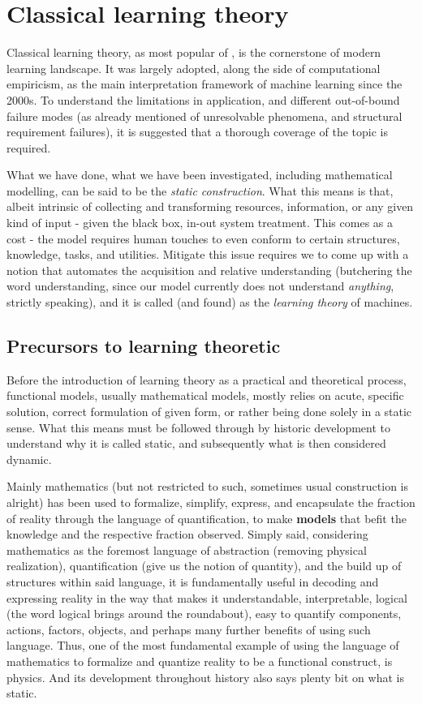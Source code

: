 \chapter{Classical learning theory}

Classical learning theory, as most popular of \cite{10.1145/1968.1972,Vapnik1999-VAPTNO,vapnik1971}, is the cornerstone of modern learning landscape. It was largely adopted, along the side of computational empiricism, as the main interpretation framework of machine learning since the 2000s. To understand the limitations in application, and different out-of-bound failure modes (as already mentioned of unresolvable phenomena, and structural requirement failures), it is suggested that a thorough coverage of the topic is required. 

What we have done, what we have been investigated, including mathematical modelling, can be said to be the \textit{static construction}. What this means is that, albeit intrinsic of collecting and transforming resources, information, or any given kind of input - given the black box, in-out system treatment. This comes as a cost - the model requires human touches to even conform to certain structures, knowledge, tasks, and utilities. Mitigate this issue requires we to come up with a notion that automates the acquisition and relative understanding (butchering the word understanding, since our model currently does not understand \textit{anything}, strictly speaking), and it is called (and found) as the \textit{learning theory} of machines. 

\section{Precursors to learning theoretic}

Before the introduction of learning theory as a practical and theoretical process, functional models, usually mathematical models, mostly relies on acute, specific solution, correct formulation of given form, or rather being done solely in a static sense. What this means must be followed through by historic development to understand why it is called static, and subsequently what is then considered dynamic. 

Mainly mathematics (but not restricted to such, sometimes usual construction is alright) has been used to formalize, simplify, express, and encapsulate the fraction of reality through the language of quantification, to make \textbf{models} that befit the knowledge and the respective fraction observed. Simply said, considering mathematics as the foremost language of abstraction (removing physical realization), quantification (give us the notion of quantity), and the build up of structures within said language, it is fundamentally useful in decoding and expressing reality in the way that makes it understandable, interpretable, logical (the word logical brings around the roundabout), easy to quantify components, actions, factors, objects, and perhaps many further benefits of using such language. Thus, one of the most fundamental example of using the language of mathematics to formalize and quantize reality to be a functional construct, is physics. And its development throughout history also says plenty bit on what is static. 

